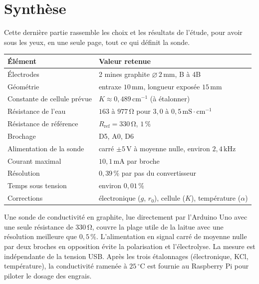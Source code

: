 \documentclass[11pt,a4paper]{article}
\newcommand{\ligne}{\arrayrulecolor{ligneENO}\specialrule{0.4pt}{0pt}{0pt}\arrayrulecolor{black}}
\newcommand{\U}[1]{\,\mathrm{#1}}
\begin{document}
\newpage
\section{Synthèse}

Cette dernière partie rassemble les choix et les résultats de l'étude, pour avoir sous les yeux, en une seule page, tout ce qui définit la sonde.


\begin{center}
\begin{tabular}{l l}
\toprule
\textbf{Élément} & \textbf{Valeur retenue} \\
\midrule
Électrodes & 2 mines graphite $\varnothing\, 2\U{mm}$, B à 4B \\ \ligne
Géométrie & entraxe $10\U{mm}$, longueur exposée $15\U{mm}$ \\ \ligne
Constante de cellule prévue & $K \approx 0{,}489\U{cm^{-1}}$ (à étalonner) \\ \ligne
Résistance de l'eau & $163$ à $977\U{\Omega}$ pour $3{,}0$ à $0{,}5\U{mS \cdot cm^{-1}}$ \\ \ligne
Résistance de référence & $R_{\text{ref}} = 330\U{\Omega}$, $1\U{\%}$ \\ \ligne
Brochage & D5, A0, D6 \\ \ligne
Alimentation de la sonde & carré $\pm 5\U{V}$ à moyenne nulle, environ $2{,}4\U{kHz}$ \\ \ligne
Courant maximal & $10{,}1\U{mA}$ par broche \\ \ligne
Résolution & $0{,}39\U{\%}$ par pas du convertisseur \\ \ligne
Temps sous tension & environ $0{,}01\U{\%}$ \\ \ligne
Corrections & électronique ($g$, $r_0$), cellule ($K$), température ($\alpha$) \\
\bottomrule
\end{tabular}
\end{center}

\begin{retenir}[conclusion]
Une sonde de conductivité en graphite, lue directement par l'Arduino Uno avec une seule résistance de $330\U{\Omega}$, couvre la plage utile de la laitue avec une résolution meilleure que $0{,}5\U{\%}$. L'alimentation en signal carré de moyenne nulle par deux broches en opposition évite la polarisation et l'électrolyse. La mesure est indépendante de la tension USB. Après les trois étalonnages (électronique, KCl, température), la conductivité ramenée à $25\U{{}^{\circ}C}$ est fournie au Raspberry Pi pour piloter le dosage des engrais.
\end{retenir}
\end{document}

